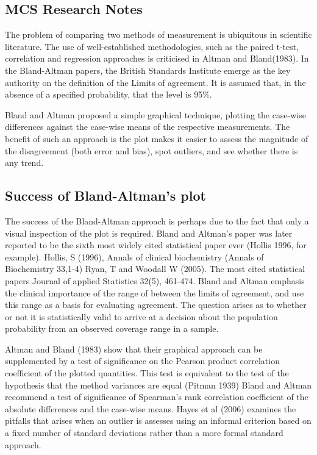 \documentclass[12pt, a4paper]{report}
\theoremstyle{plain}
\theoremstyle{definition}
\theoremstyle{remark}
\begin{document}
	
\subsection{MCS Research Notes}
The problem of comparing two methods of measurement is ubiquitous in scientific literature.
The use of  well-established methodologies, such as the paired t-test, correlation and regression approaches is criticised in Altman and Bland(1983).
In the Bland-Altman papers, the British Standards Institute emerge as the key authority on the definition of the Limits of agreement.
It is assumed that, in the absence of a specified probability, that the level is 95\%.

Bland and Altman proposed a simple graphical technique, plotting the case-wise differences against the case-wise means of the respective measurements.
The benefit of such an approach is the plot makes it easier to assess the magnitude of the disagreement (both error and bias), spot outliers, and see whether there is any trend.

\subsection{Success of Bland-Altman’s plot}
The success of the Bland-Altman approach is perhaps due to the fact that only a visual inspection of the plot is required. Bland and Altman’s paper was later reported to be the sixth most widely cited statistical paper ever (Hollis 1996, for example).
Hollis, S (1996), Annals of clinical biochemistry (Annals of Biochemistry 33,1-4)
Ryan, T and Woodall W (2005). The most cited statistical papers Journal of applied Statistics 32(5), 461-474.
Bland and Altman emphasis the clinical importance of the range of between the limits of agreement, and use this range as a basis for evaluating agreement.
The question arises as to whether  or not it is statistically valid to arrive at a decision about the population probability from an observed coverage range in a sample.

Altman and Bland (1983) show that their graphical approach can be supplemented by a test of significance on the Pearson product correlation coefficient of the plotted quantities. This test is equivalent to the test of the hypothesis that the method variances are equal (Pitman 1939)
Bland and Altman recommend a test of significance of Spearman’s rank correlation coefficient of the absolute differences and the case-wise means.
Hayes et al (2006) examines the pitfalls that arises when an outlier is assesses using an informal criterion based on a fixed number of standard deviations rather than a more formal standard approach.
\end{document}
